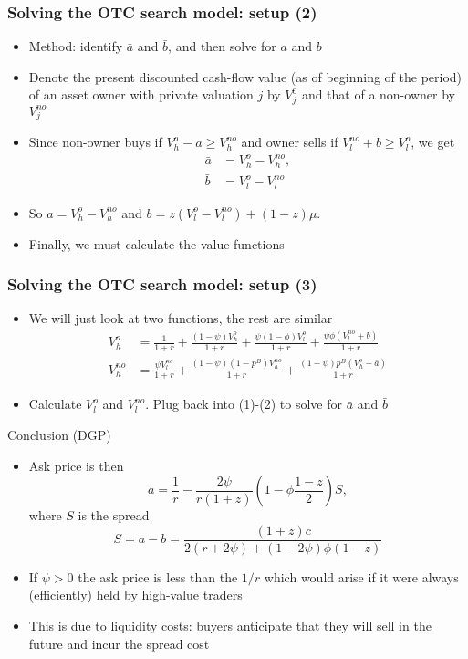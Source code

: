 \documentclass[english,10pt
,aspectratio=169
]{beamer}
\begin{document}
\begin{frame}
	\frametitle{Solving the OTC search model: setup (2)}
	\begin{itemize}
		\item Method: identify $\bar{a}$ and $\bar{b}$, and then solve for $a$ and $b$
		\item Denote the present discounted cash-flow value (as of beginning of the period) of an asset owner with private valuation $j$ by $V^0_j$ and that of a non-owner by $V^{no}_j$
		\item Since non-owner buys if $V^o_h-a \geq V^{no}_h$ and owner sells if $V^{no}_l+b \geq V^o_l$, we get
		\begin{align}
		\bar{a} 	&= V^o_h-V^{no}_h, \\
		\bar{b}	&= V^o_l-V^{no}_l 
		\end{align}
		\item So $a=V^o_h-V^{no}_h$ and $b=z(V^o_l-V^{no}_l ) + (1-z)\mu$.
		\item Finally, we must calculate the value functions
	\end{itemize}
\end{frame}


\begin{frame}
	\frametitle{Solving the OTC search model: setup (3)}
	\begin{itemize}
		\item We will just look at two functions, the rest are similar
		\begin{align*}
		V^o_h 	& = \frac{1}{1+r} + \frac{(1-\psi)V^o_h}{1+r} + \frac{\psi(1-\phi)V^o_l}{1+r}+\frac{\psi\phi(V^{no}_l+b)}{1+r} \\
		V^{no}_h 	& = \frac{\psi V^{no}_l}{1+r} + \frac{(1-\psi)(1-p^B)V^{no}_h}{1+r}+\frac{(1-\psi)p^B (V^o_h-\bar{a})}{1+r}
		\end{align*}
		\item Calculate $V^o_l$ and $V^{no}_l$. Plug back into (1)-(2) to solve for $\bar{a}$ and $\bar{b}$
	\end{itemize}
\end{frame}


\begin{frame}{Conclusion (DGP)}
	\begin{itemize}
		\item Ask price is then
		\[
		a=\frac{1}{r}-\frac{2\psi}{r(1+z)}\left(1-\phi\frac{1-z}{2}\right)S,
		\]
		where $S$ is the spread
		\[
		S=a-b=\frac{(1+z)c}{2(r+2\psi)+(1-2\psi)\phi(1-z)}
		\]
		\item If $\psi>0$ the ask price is less than the $1/r$ which would arise if it were always (efficiently) held by high-value traders
		\item This is due to liquidity costs: buyers anticipate that they will sell in the future and incur the spread cost
	\end{itemize}
\end{frame}
\end{document}

